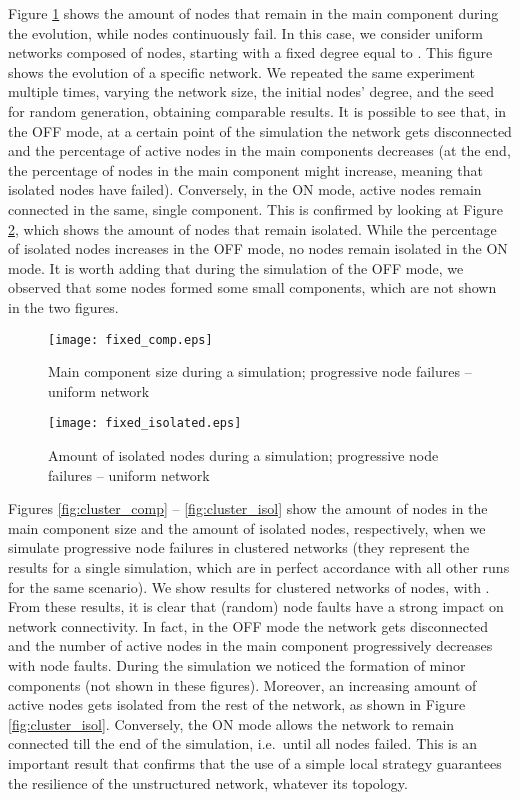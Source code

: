\documentclass{www13-companion-accepted}
\begin{document}
Figure \ref{fig:fixed_comp} shows the amount of nodes that remain in the main component during the evolution, while nodes continuously fail. In this case, we consider uniform networks composed of  nodes, starting with a fixed degree equal to . This figure shows the evolution of a specific network. We repeated the same experiment multiple times, varying the network size, the initial nodes' degree, and the seed for random generation, obtaining comparable results. 
It is possible to see that, in the OFF mode, at a certain point of the simulation the network gets disconnected and the percentage of active nodes in the main components decreases (at the end, the percentage of nodes in the main component might increase, meaning that isolated nodes have failed). Conversely, in the ON mode, active nodes remain connected in the same, single component. 
This is confirmed by looking at Figure \ref{fig:fixed_isol}, which shows the amount of nodes that remain isolated. While the percentage of isolated nodes increases in the OFF mode, no nodes remain isolated in the ON mode. It is worth adding that during the simulation of the OFF mode, we observed that some nodes formed some small components, which are not shown in the two figures.

\begin{figure}[thbp]
   \centering
   \texttt{[image: fixed\_comp.eps]}
\caption{Main component size during a simulation; progressive node failures -- uniform network}
   \label{fig:fixed_comp}
\end{figure}

\begin{figure}[thbp]
   \centering
   \texttt{[image: fixed\_isolated.eps]}
\caption{Amount of isolated nodes during a simulation; progressive node failures -- uniform network}
   \label{fig:fixed_isol}
\end{figure}

Figures \ref{fig:cluster_comp} -- \ref{fig:cluster_isol} show the amount of nodes in the main component size and the amount of isolated nodes, respectively, when we simulate progressive node failures in clustered networks (they represent the results for a single simulation, which are in perfect accordance with all other runs for the same scenario). We show results for clustered networks of  nodes, with . 
From these results, it is clear that (random) node faults have a strong impact on network connectivity. In fact, in the OFF mode the network gets disconnected and the number of active nodes in the main component progressively decreases with node faults. 
During the simulation we noticed the formation of minor components (not shown in these figures). Moreover, an increasing amount of active nodes gets isolated from the rest of the network, as shown in Figure \ref{fig:cluster_isol}. 
Conversely, the ON mode allows the network to remain connected till the end of the simulation, i.e.~until all nodes failed. This is an important result that confirms that the use of a simple local strategy guarantees the resilience of the unstructured network, whatever its topology.
\end{document}

